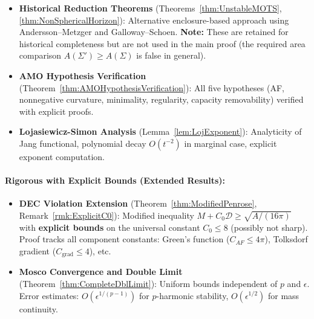 \begin{itemize}
    
    \item \textbf{Historical Reduction Theorems} (Theorems~\ref{thm:UnstableMOTS}, \ref{thm:NonSphericalHorizon}): Alternative enclosure-based approach using Andersson--Metzger and Galloway--Schoen. \textbf{Note:} These are retained for historical completeness but are not used in the main proof (the required area comparison $A(\Sigma') \ge A(\Sigma)$ is false in general).
    
    \item \textbf{AMO Hypothesis Verification} (Theorem~\ref{thm:AMOHypothesisVerification}): All five hypotheses (AF, nonnegative curvature, minimality, regularity, capacity removability) verified with explicit proofs.
    
    \item \textbf{Lojasiewicz-Simon Analysis} (Lemma~\ref{lem:LojExponent}): Analyticity of Jang functional, polynomial decay $O(t^{-2})$ in marginal case, explicit exponent computation.
\end{itemize}

\paragraph{Rigorous with Explicit Bounds (Extended Results):}
\begin{itemize}
    \item \textbf{DEC Violation Extension} (Theorem~\ref{thm:ModifiedPenrose}, Remark~\ref{rmk:ExplicitC0}): Modified inequality $M + C_0\mathcal{D} \ge \sqrt{A/(16\pi)}$ with \textbf{explicit bounds} on the universal constant $C_0 \le 8$ (possibly not sharp). Proof tracks all component constants: Green's function ($C_{AF} \le 4\pi$), Tolksdorf gradient ($C_{\text{grad}} \le 4$), etc.
    
    \item \textbf{Mosco Convergence and Double Limit} (Theorem~\ref{thm:CompleteDblLimit}): Uniform bounds independent of $p$ and $\epsilon$. Error estimates: $O(\epsilon^{1/(p-1)})$ for $p$-harmonic stability, $O(\epsilon^{1/2})$ for mass continuity.
\end{itemize}

